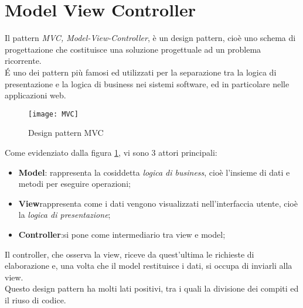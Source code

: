 \section{Model View Controller}
\label{sec:MVC}
Il pattern \emph{MVC, Model-View-Controller}, è un design pattern, cioè uno schema di progettazione che costituisce una soluzione progettuale ad un problema ricorrente.\\
\'E uno dei pattern più famosi ed utilizzati per la separazione tra la logica di presentazione e la logica di business nei sistemi software, ed in particolare nelle applicazioni web.\\
\begin{figure}[h]
	\centering
	\texttt{[image: MVC]}
	\caption{Design pattern MVC}
	\label{mvc-schema}
\end{figure}
Come evidenziato dalla figura \ref{mvc-schema}, vi sono 3 attori principali:
\begin{itemize}
	\item \textbf{Model}: rappresenta la cosiddetta \emph{logica di business}, cioè l'insieme di dati e metodi per eseguire operazioni;
	\item \textbf{View}rappresenta come i dati vengono visualizzati nell'interfaccia utente, cioè la \emph{logica di presentazione};
	\item \textbf{Controller}:si pone come intermediario tra view e model;
\end{itemize}
Il controller, che osserva la view, riceve da quest'ultima le richieste di elaborazione e, una volta che il model restituisce i dati, si occupa di inviarli alla view.\\
Questo design pattern ha molti lati positivi, tra i quali la divisione dei compiti ed il riuso di codice.\\


\newpage